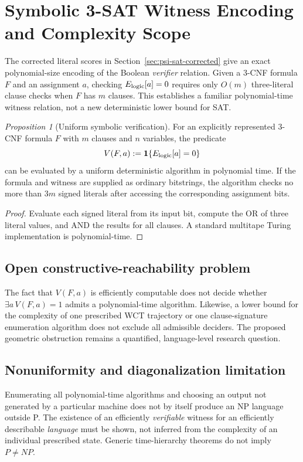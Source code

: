 \documentclass[12pt]{article}
\theoremstyle{remark}
\newtheorem{proposition}[theorem]{Proposition}
\begin{document}
\clearpage
\appendix
\section{Symbolic 3-SAT Witness Encoding and Complexity Scope}
\label{sec:symbolic-sat}
The corrected literal scores in Section~\ref{sec:psi-sat-corrected}
give an exact polynomial-size encoding of the Boolean \emph{verifier}
relation. Given a $3$-CNF formula $F$ and an assignment $a$, checking
$E_{\rm logic}[a]=0$ requires only $O(m)$ three-literal clause checks
when $F$ has $m$ clauses. This establishes a familiar polynomial-time
witness relation, not a new deterministic lower bound for SAT.

\begin{proposition}[Uniform symbolic verification]
For an explicitly represented $3$-CNF formula $F$ with $m$ clauses
and $n$ variables, the predicate
\[
V(F,a):=\mathbf{1}\{E_{\rm logic}[a]=0\}
\]
can be evaluated by a uniform deterministic algorithm in polynomial
time. If the formula and witness are supplied as ordinary bitstrings,
the algorithm checks no more than $3m$ signed literals after accessing
the corresponding assignment bits.
\end{proposition}
\begin{proof}
Evaluate each signed literal from its input bit, compute the OR of
three literal values, and AND the results for all clauses. A
standard multitape Turing implementation is polynomial-time.
\end{proof}
\subsection{Open constructive-reachability problem}
The fact that $V(F,a)$ is efficiently computable does not decide
whether $\exists a\,V(F,a)=1$ admits a polynomial-time algorithm.
Likewise, a lower bound for the complexity of one prescribed WCT
trajectory or one clause-signature enumeration algorithm does not
exclude all admissible deciders. The proposed geometric obstruction
remains a quantified, language-level research question.
\subsection{Nonuniformity and diagonalization limitation}
Enumerating all polynomial-time algorithms and choosing an output
not generated by a particular machine does not by itself produce an
NP language outside P. The existence of an efficiently \emph{verifiable}
witness for an efficiently describable \emph{language} must be shown,
not inferred from the complexity of an individual prescribed state.
Generic time-hierarchy theorems do not imply $P\ne NP$.
\end{document}
